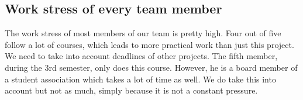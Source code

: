 \documentclass[a4paper]{article}
\begin{document}
\subsection{Work stress of every team member}
The work stress of most members of our team is pretty high. Four out of five follow a lot of courses, which leads to more practical work than just this project. We need to take into account deadlines of other projects. The fifth member, during the 3rd semester, only does this course. However, he is a board member of a student association which takes a lot of time as well. We do take this into account but not as much, simply because it is not a constant pressure.
\end{document}
